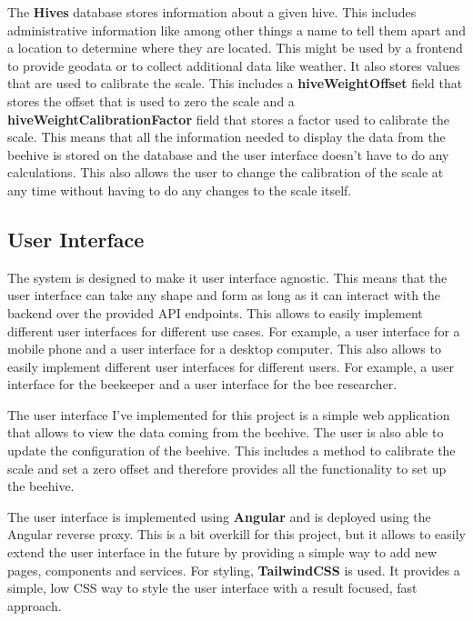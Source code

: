 The \textbf{Hives} database stores information about a given hive. This includes administrative information like among other things a name to tell them apart and a location to determine where they are located. This might be used by a frontend to provide geodata or to collect additional data like weather. It also stores values that are used to calibrate the scale. This includes a \textbf{hiveWeightOffset} field that stores the offset that is used to zero the scale and a \textbf{hiveWeightCalibrationFactor} field that stores a factor used to calibrate the scale. This means that all the information needed to display the data from the beehive is stored on the database and the user interface doesn't have to do any calculations. This also allows the user to change the calibration of the scale at any time without having to do any changes to the scale itself.

\newpage
\subsection{User Interface}\label{sec:user_interface}
The system is designed to make it user interface agnostic. This means that the user interface can take any shape and form as long as it can interact with the backend over the provided API endpoints. This allows to easily implement different user interfaces for different use cases. For example, a user interface for a mobile phone and a user interface for a desktop computer. This also allows to easily implement different user interfaces for different users. For example, a user interface for the beekeeper and a user interface for the bee researcher.

The user interface I've implemented for this project is a simple web application that allows to view the data coming from the beehive. The user is also able to update the configuration of the beehive. This includes a method to calibrate the scale and set a zero offset and therefore provides all the functionality to set up the beehive.

The user interface is implemented using \textbf{Angular} and is deployed using the Angular reverse proxy. This is a bit overkill for this project, but it allows to easily extend the user interface in the future by providing a simple way to add new pages, components and services. For styling, \textbf{TailwindCSS} is used. It provides a simple, low CSS way to style the user interface with a result focused, fast approach.

